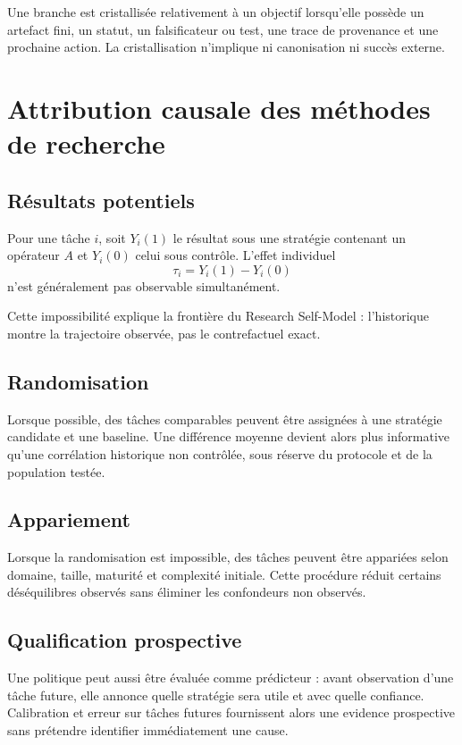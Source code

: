 Une branche est cristallisée relativement à un objectif lorsqu'elle possède un artefact fini, un statut, un falsificateur ou test, une trace de provenance et une prochaine action. La cristallisation n'implique ni canonisation ni succès externe.

\chapter{Attribution causale des méthodes de recherche}

\section{Résultats potentiels}

Pour une tâche $i$, soit $Y_i(1)$ le résultat sous une stratégie contenant un opérateur $A$ et $Y_i(0)$ celui sous contrôle. L'effet individuel
\[
\tau_i=Y_i(1)-Y_i(0)
\]
n'est généralement pas observable simultanément.

Cette impossibilité explique la frontière du Research Self-Model : l'historique montre la trajectoire observée, pas le contrefactuel exact.

\section{Randomisation}

Lorsque possible, des tâches comparables peuvent être assignées à une stratégie candidate et une baseline. Une différence moyenne devient alors plus informative qu'une corrélation historique non contrôlée, sous réserve du protocole et de la population testée.

\section{Appariement}

Lorsque la randomisation est impossible, des tâches peuvent être appariées selon domaine, taille, maturité et complexité initiale. Cette procédure réduit certains déséquilibres observés sans éliminer les confondeurs non observés.

\section{Qualification prospective}

Une politique peut aussi être évaluée comme prédicteur : avant observation d'une tâche future, elle annonce quelle stratégie sera utile et avec quelle confiance. Calibration et erreur sur tâches futures fournissent alors une evidence prospective sans prétendre identifier immédiatement une cause.

